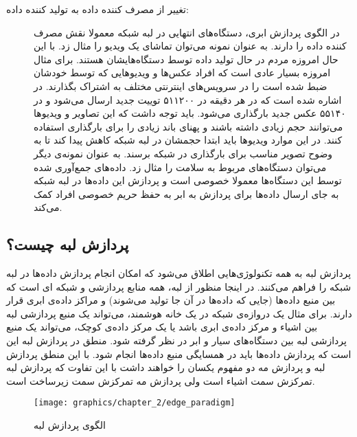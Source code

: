 \begin{description}
        \item [تغییر از مصرف کننده داده به تولید کننده داده:]
          در الگوی پردازش ابری، دستگاه‌های انتهایی در لبه شبکه معمولا نقش مصرف کننده داده را دارند.
          به عنوان نمونه می‌توان تماشای یک ویدیو را مثال زد.
          با این حال امروزه مردم در حال تولید داده توسط دستگاه‌هایشان هستند.
          برای مثال امروزه بسیار عادی است که افراد عکس‌ها و ویدیو‌هایی که توسط خودشان ضبط شده است را در سرویس‌های اینترنتی مختلف به اشتراک بگذارند.
          در \cite{2019domo} اشاره شده است که در هر دقیقه در  ۵۱۱۲۰۰ توییت جدید ارسال می‌شود و در  ۵۵۱۴۰ عکس جدید بارگذاری می‌شود.
          باید توجه داشت که این تصاویر و ویدیوها می‌توانند حجم زیادی داشته باشند و پهنای باند زیادی را برای بارگذاری استفاده کنند.
          در این موارد ویدیو‌ها باید ابتدا حجمشان در لبه شبکه کاهش پیدا کند تا به وضوح تصویر مناسب برای بارگذاری در شبکه برسند.
          به عنوان نمونه‌ی دیگر می‌توان دستگاه‌های مربوط به سلامت را مثال زد.
          داده‌های جمع‌آوری شده توسط این دستگاه‌ها معمولا خصوصی است و پردازش این داده‌ها در لبه شبکه به جای ارسال داده‌ها برای پردازش به ابر به حفظ حریم خصوصی افراد کمک می‌کند.

      \end{description}
    
    \subsection{پردازش لبه چیست؟}
      پردازش لبه به همه تکنولوژی‌هایی اطلاق می‌شود که امکان انجام پردازش‌ داده‌ها در لبه شبکه را فراهم می‌کنند.
      در اینجا منظور از لبه، همه منابع پردازشی و شبکه ای است که بین منبع داده‌ها (جایی که داده‌ها در آن جا تولید می‌شوند) و مراکز داده‌ی ابری قرار دارند.
      برای مثال یک دروازه‌ی شبکه در یک خانه هوشمند، می‌تواند یک منبع پردازشی لبه بین اشیاء و مرکز داده‌ی ابری باشد یا یک مرکز داده‌ی کوچک، می‌تواند یک منبع پردازشی لبه بین دستگاه‌های سیار و ابر در نظر گرفته شود.
      منطق در پردازش لبه این است که پردازش داده‌ها باید در همسایگی منبع داده‌ها انجام شود.
      با این منطق پردازش لبه و پردازش مه دو مفهوم یکسان را خواهند داشت با این تفاوت که پردازش لبه تمرکزش سمت اشیاء است ولی پردازش مه تمرکزش سمت زیرساخت است.

      \begin{figure}[h]
        \centerline{\texttt{[image: graphics/chapter\_2/edge\_paradigm]}}
        \caption{الگوی پردازش لبه \cite{shi2016edge}}
        \label{fig:chapter_2:edge_paradigm}
      \end{figure}
      
